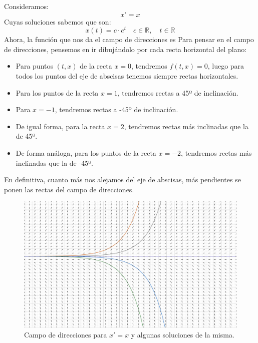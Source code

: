 \begin{ejemplo}
    Consideramos:
    \begin{equation*}
        x'=x
    \end{equation*}
    Cuyas soluciones sabemos que son:
    \begin{equation*}
        x(t) = c\cdot e^{t} \quad c\in \mathbb{R}, \quad t\in \mathbb{R}
    \end{equation*}
    Ahora, la función que nos da el campo de direcciones es
    Para pensar en el campo de direcciones, pensemos en ir dibujándolo por cada recta horizontal del plano:
    \begin{itemize}
        \item Para puntos $(t,x)$ de la recta $x=0$, tendremos $f(t,x) = 0$, luego para todos los puntos del eje de abscisas tenemos siempre rectas horizontales.
        \item Para los puntos de la recta $x=1$, tendremos rectas a 45º de inclinación.
        \item Para $x=-1$, tendremos rectas a -45º de inclinación.
        \item De igual forma, para la recta $x=2$, tendremos rectas más inclinadas que la de 45º.
        \item De forma análoga, para los puntos de la recta $x=-2$, tendremos rectas más inclinadas que la de -45º.
    \end{itemize}
    En definitiva, cuanto más nos alejamos del eje de abscisas, más pendientes se ponen las rectas del campo de direcciones.

    \begin{figure}[H]
        \centering
        \includegraphics[width=0.6\linewidth]{Imagenes/campo_direcciones_3.png}
        \caption{Campo de direcciones para $x'=x$ y algunas soluciones de la misma.}
    \end{figure}
\end{ejemplo}


